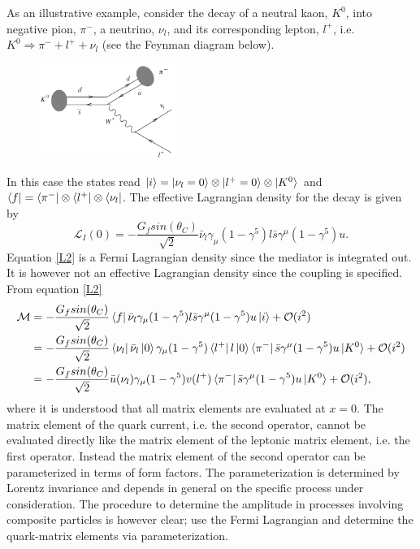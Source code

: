 \begin{example}
	As an illustrative example, consider the decay of a neutral kaon, $K^0$, into negative pion, $\pi^-$, a neutrino, $\nu_l$, and its corresponding lepton, $l^{+}$, i.e. $K^0\Rightarrow \pi^-+l^++\nu_l$ (see the Feynman diagram below).
	\begin{figure}[H]
		\captionsetup{width=1\textwidth}
		\centering
		\includegraphics[width=0.4\textwidth]{figures/feyn1}
	\end{figure}
	In this case the states read $\ket{i}=\ket{\nu_l=0}\otimes \ket{l^{+}=0}\otimes\ket{K^0}$ and $\bra{f}=\bra{\pi^-}\otimes \bra{l^+}\otimes \bra{\nu_l}$. The effective Lagrangian density for the decay is given by
	\begin{equation}
		\mathcal{L}_I(0)=-\frac{G_fsin(\theta_C)}{\sqrt{2}}\bar{\nu}_l\gamma_\mu(1-\gamma^5)l\bar{s}\gamma^\mu(1-\gamma^5)u.
		\label{L2}
	\end{equation} 
	Equation \eqref{L2} is a Fermi Lagrangian density since the mediator is integrated out. It is however not an effective Lagrangian density since the coupling is specified. From equation \eqref{L2}
	\begin{equation}
		\begin{split}
			\mathcal{M}&=-\frac{G_fsin(\theta_C)}{\sqrt{2}}\bra{f}\bar{\nu}_l\gamma_\mu(1-\gamma^5)l\bar{s}\gamma^\mu(1-\gamma^5)u\ket{i}+\mathcal{O}(i^2)\\
			&=-\frac{G_fsin(\theta_C)}{\sqrt{2}}\bra{\nu_l}\bar{\nu}_l\ket{0}\gamma_\mu(1-\gamma^5)\bra{l^+}l\ket{0}\bra{\pi^-}\bar{s}\gamma^\mu(1-\gamma^5)u\ket{K^0}+\mathcal{O}(i^2)\\
			&=-\frac{G_fsin(\theta_C)}{\sqrt{2}}\bar{u}(\nu_l)\gamma_\mu(1-\gamma^5)v(l^+)\bra{\pi^-}\bar{s}\gamma^\mu(1-\gamma^5)u\ket{K^0}+\mathcal{O}(i^2),\\
		\end{split}
		\label{S12}
	\end{equation}   
	where it is understood that all matrix elements are evaluated at $x=0$. The matrix element of the quark current, i.e. the second operator, cannot be evaluated directly like the matrix element of the leptonic matrix element, i.e. the first operator. Instead the matrix element of the second operator can be parameterized in terms of form factors. The parameterization is determined by Lorentz invariance and depends in general on the specific process under consideration. The procedure to determine the amplitude in processes involving composite particles is however clear; use the Fermi Lagrangian and determine the quark-matrix elements via parameterization.
\end{example}